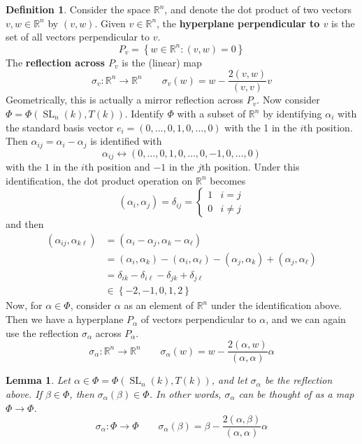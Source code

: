\documentclass[12pt]{article}
\newtheorem{lemma}[theorem]{Lemma}
\theoremstyle{definition}
\newtheorem{definition}[theorem]{Definition}
\newcommand{\R}{\mathbb{R}}
\newcommand{\sig}{\sigma}
\newcommand{\lb}{\left\{}
\newcommand{\rb}{\right\}}
\newcommand{\tbf}{\textbf}
\DeclareMathOperator{\SL}{SL}
\begin{document}
\begin{definition}
Consider the space $\R^n$, and denote the dot product of two vectors $v, w \in \R^n$ by $(v, w)$. Given $v \in \R^n$, the \tbf{hyperplane perpendicular to $v$} is the set of all vectors perpendicular to $v$.
\[
	P_v = \lb w \in \R^n : (v,w) = 0 \rb
\]
The \tbf{reflection across $P_v$} is the (linear) map
\[
	\sig_v:\R^n \to \R^n \qquad \sig_v(w) = w - \frac{2 (v,w)}{(v,v)} v
\]
Geometrically, this is actually a mirror reflection across $P_v$. Now consider $\Phi = \Phi(\SL_n(k), T(k))$. Identify $\Phi$ with a subset of $\R^n$ by identifying $\alpha_i$ with the standard basis vector $e_i = (0,  \ldots, 0, 1, 0, \ldots, 0)$ with the 1 in the $i$th position. Then $\alpha_{ij} = \alpha_i - \alpha_j$ is identified with
\[
	\alpha_{ij} \leftrightarrow (0, \ldots, 0, 1, 0, \ldots, 0, -1, 0, \ldots ,0)
\]
with the $1$ in the $i$th position and $-1$ in the $j$th position. Under this identification, the dot product operation on $\R^n$ becomes
\[
	(\alpha_i, \alpha_j) = \delta_{ij} =
	\begin{cases}
		1 & i = j \\
		0 & i \neq j
	\end{cases}
\]
and then
\begin{align*}
	(\alpha_{ij}, \alpha_{k\ell}) &= (\alpha_i - \alpha_j, \alpha_k - \alpha_\ell) \\
	&= (\alpha_i, \alpha_k) - (\alpha_i, \alpha_{\ell}) - (\alpha_j, \alpha_k) + (\alpha_{j}, \alpha_\ell) \\
	&= \delta_{ik} - \delta_{i\ell} - \delta_{jk} + \delta_{j\ell} \\
	&\in \lb -2, -1, 0, 1, 2 \rb
\end{align*}
Now, for $\alpha \in \Phi$, consider $\alpha$ as an element of $\R^n$ under the identification above. Then we have a hyperplane $P_\alpha$ of vectors perpendicular to $\alpha$, and we can again use the reflection $\sig_\alpha$ across $P_\alpha$.
\[
	\sig_\alpha:\R^n \to \R^n \qquad \sig_\alpha(w) = w - \frac{2 (\alpha,w)}{(\alpha,\alpha)} \alpha
\]
\end{definition}

\begin{lemma}
Let $\alpha \in \Phi = \Phi(\SL_n(k), T(k))$, and let $\sig_\alpha$ be the reflection above. If $\beta \in \Phi$, then $\sig_\alpha(\beta) \in \Phi$. In other words, $\sig_\alpha$ can be thought of as a map $\Phi \to \Phi$.
\[
	\sig_\alpha:\Phi \to \Phi \qquad \sig_\alpha(\beta) = \beta - \frac{2 (\alpha,\beta)}{(\alpha,\alpha)} \alpha
\]
\end{lemma}
\end{document}
